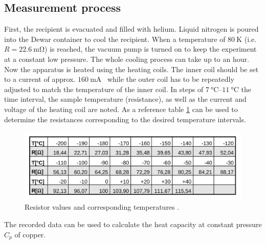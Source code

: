 \subsection{Measurement process}
First, the recipient is evacuated and filled with helium. Liquid nitrogen is poured into the Dewar container to cool the recipient. When a temperature of $\qty{80}{\kelvin}$
(i.e. $R = \qty{22.6}{\milli\ohm}$) is reached, the vacuum pump is turned on to keep the experiment at a constant low pressure. The whole cooling process can take up to an hour.
Now the apparatus is heated using the heating coils. The inner coil should be set to a current of approx. $\qty{160}{\milli\ampere}$  while the outer coil has
to be repeatedly adjusted to match the temperature of the inner coil. In steps of $\qtyrange{7}{11}{\celsius}$ the time interval, the sample temperature (resistance),
as well as the current and voltage of the heating coil are noted. As a reference table \ref{fig:R_T} can be used to determine the resistances corresponding to the desired temperature
intervals.

\begin{figure}
    \centering
    \includegraphics[width = .8\textwidth]{"content/pics/R_T.png"}
    \caption{Resistor values and corresponding temperatures \cite{V47}.}
    \label{fig:R_T}
\end{figure}

The recorded data can be used to calculate the heat capacity at constant pressure $C_p$ of copper.
